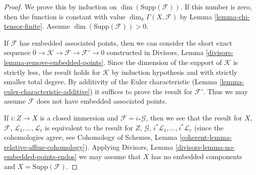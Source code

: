 \begin{proof}
We prove this by induction on $\dim(\text{Supp}(\mathcal{F}))$.
If this number is zero, then the function is constant with value
$\dim_k \Gamma(X, \mathcal{F})$ by Lemma \ref{lemma-chi-tensor-finite}.
Assume $\dim(\text{Supp}(\mathcal{F})) > 0$.

\medskip\noindent
If $\mathcal{F}$ has embedded associated points, then we can consider
the short exact sequence
$0 \to \mathcal{K} \to \mathcal{F} \to \mathcal{F}' \to 0$
constructed in Divisors, Lemma \ref{divisors-lemma-remove-embedded-points}.
Since the dimension of the support of $\mathcal{K}$ is strictly less,
the result holds for $\mathcal{K}$ by induction hypothesis and with
strictly smaller total degree.
By additivity of the Euler characteristic
(Lemma \ref{lemma-euler-characteristic-additive})
it suffices to prove the result for $\mathcal{F}'$. Thus we may assume
$\mathcal{F}$ does not have embedded associated points.

\medskip\noindent
If $i : Z \to X$ is a closed immersion and $\mathcal{F} = i_*\mathcal{G}$,
then we see that the result for $X$, $\mathcal{F}$,
$\mathcal{L}_1, \ldots, \mathcal{L}_r$ is equivalent to the result
for $Z$, $\mathcal{G}$, $i^*\mathcal{L}_1, \ldots, i^*\mathcal{L}_r$
(since the cohomologies agree, see
Cohomology of Schemes, Lemma \ref{coherent-lemma-relative-affine-cohomology}).
Applying Divisors, Lemma \ref{divisors-lemma-no-embedded-points-endos}
we may assume that $X$ has no embedded components and
$X = \text{Supp}(\mathcal{F})$.


\end{proof}
